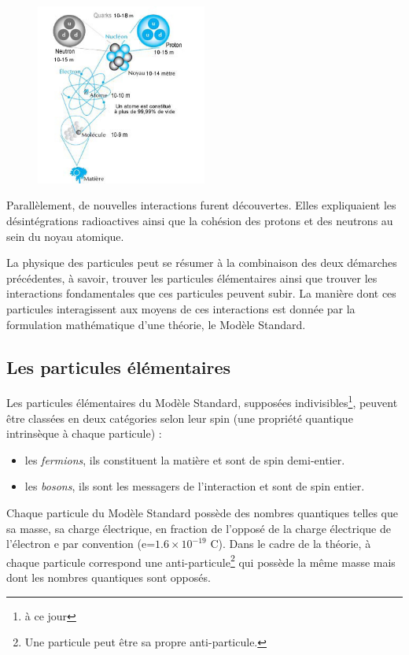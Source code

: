 \vspace*{-0.5cm}
\begin{figure}[h!]
\centering
\includegraphics[width=0.50\textwidth]{SM/structure.jpg}
\label{structure}
\end{figure}

\vspace*{-0.5cm}
Parallèlement, de nouvelles interactions furent découvertes. Elles expliquaient les désintégrations radioactives ainsi que la cohésion des protons et des neutrons au sein du noyau atomique.

La physique des particules peut se résumer à la combinaison des deux démarches précédentes, à savoir, trouver les particules élémentaires ainsi que trouver les interactions fondamentales que ces particules peuvent subir. La manière dont ces particules interagissent aux moyens de ces interactions est donnée par la formulation mathématique d'une théorie, le Modèle Standard.

\subsection{Les particules élémentaires}
Les particules élémentaires du Modèle Standard, supposées indivisibles\footnote{à ce jour}, peuvent être classées en deux catégories selon leur spin (une propriété quantique intrinsèque à chaque particule) :
\begin{itemize}[label=$\bullet$]
\item les \textit{fermions}, ils constituent la matière et sont de spin demi-entier.
\item les \textit{bosons}, ils sont les messagers de l'interaction et sont de spin entier.
\end{itemize}
Chaque particule du Modèle Standard possède des nombres quantiques telles que sa masse, sa charge électrique, en fraction de l'opposé de la charge électrique de l'électron e par convention (e=$1.6\times10^{-19}$ C). Dans le cadre de la théorie, à chaque particule correspond une anti-particule\footnote{Une particule peut être sa propre anti-particule.} qui possède la même masse mais dont les nombres quantiques sont opposés.

